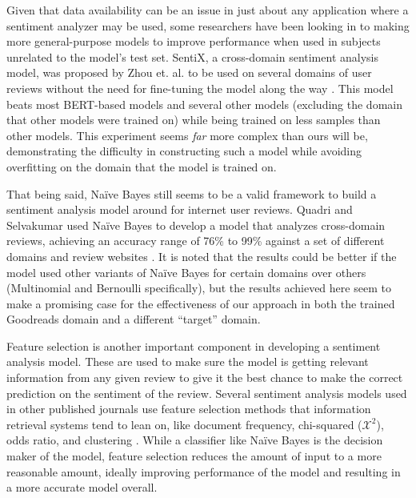 Given that data availability can be an issue in just about any application where a sentiment analyzer may
be used, some researchers have been looking in to making more general-purpose models to improve performance
when used in subjects unrelated to the model's test set. SentiX, a cross-domain sentiment analysis model, was
proposed by Zhou et. al. to be used on several domains of user reviews without the need for fine-tuning the model
along the way \cite{Zhou2020}. This model beats most BERT-based models and several other models (excluding the domain that other
models were trained on) while being trained on less samples than other models. This experiment seems \textit{far} more
complex than ours will be, demonstrating the difficulty in constructing such a model while avoiding overfitting
on the domain that the model is trained on.

That being said, Na\"ive Bayes still seems to be a valid framework to build a sentiment analysis model around for
internet user reviews. Quadri and Selvakumar used Na\"ive Bayes to develop a model that analyzes cross-domain
reviews, achieving an accuracy range of 76\% to 99\% against a set of different domains and review websites 
\cite{Quadri2020}. It is noted that the results could be better if the model used other variants of Na\"ive Bayes
for certain domains over others (Multinomial and Bernoulli specifically), but the results achieved here seem to make
a promising case for the effectiveness of our approach in both the trained Goodreads domain and a different
``target'' domain.

Feature selection is another important component in developing a sentiment analysis model. These are used to make
sure the model is getting relevant information from any given review to give it the best chance to make the correct
prediction on the sentiment of the review. Several sentiment analysis models used in other published journals use
feature selection methods that information retrieval systems tend to lean on, like document frequency, chi-squared ($\mathcal{X}^2$),
odds ratio, and clustering \cite{Hung2015}. While a classifier like Na\"ive Bayes is the decision maker of the model, feature selection
reduces the amount of input to a more reasonable amount, ideally improving performance of the model and resulting
in a more accurate model overall.